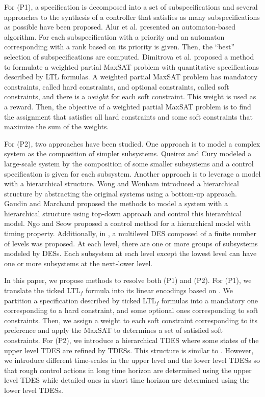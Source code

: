\documentclass{article}
\begin{document}
%
For (P1), a specification is decomposed into a set of subspecifications and several approaches to the synthesis of a controller that satisfies as many subspecifications as possible have been proposed. 
Alur et al.\cite{AKW2008} presented an automaton-based algorithm.
For each subspecification with a priority and an automaton corresponding with a rank based on its priority is given. 
%
Then, the ``best'' selection of subspecifications are computed.
%
Dimitrova et al.\cite{DGT2018} proposed a method to formulate a weighted partial MaxSAT problem with quantitative specifications described by LTL formulas.
A weighted partial MaxSAT problem has mandatory constraints, called hard constraints, and optional constraints, called soft constraints, and there is a $weight$ for each soft constraint. 
This weight is used as a reward.
Then, the objective of a weighted partial MaxSAT problem is to find the assignment that satisfies all hard constraints and some soft constraints that maximize the sum of the weights.

%
For (P2), two approaches have been studied.
One approach is to model a complex system as the composition of simpler subsystems.
Queiroz and Cury\cite{QC2000} modeled a large-scale system by the composition of some smaller subsystems and a control specification is given for each subsystem.
%
Another approach is to leverage a model with a hierarchical structure.
%
Wong and Wonham\cite{WW1996a,WW1996b} introduced a hierarchical structure by abstracting the original systems using a bottom-up approach.
Gaudin and Marchand\cite{GAUDIN2004131} proposed the methods to model a system with a hierarchical structure using top-down approach and control this hierarchical model.
%
Ngo and Seow\cite{Ngo2018} proposed a control method for a hierarchical model with timing property.
%
Additionally, in \cite{8759973,7497833}, a multilevel DES composed of a finite number of levels was proposed. At each level, there are one or more groups of subsystems modeled by DESs. 
Each subsystem at each level except the lowest level can have one or more subsystems at the next-lower level.

%
%
In this paper, we propose methods to resolve both (P1) and (P2).
For (P1), we translate the ticked LTL$_f$ formula into its linear encodings based on \cite{DGT2018}. We partition a specification described by ticked LTL$_f$ formulas into a mandatory one corresponding to a hard constraint, and some optional ones corresponding to soft constraints.
%
Then, we assign a weight to each soft constraint corresponding to its preference and apply the MaxSAT to determines a set of satisfied soft constraints. 
For (P2), we introduce a hierarchical TDES where some states of the upper level TDES are refined by TDESs.
%
This structure is similar to \cite{GAUDIN2004131,8759973}.
However, we introduce different time-scales in the upper level and the lower level TDESs so that rough control actions in long time horizon are determined using the upper level TDES while detailed ones in short time horizon are determined using the lower level TDESs. 
\end{document}
